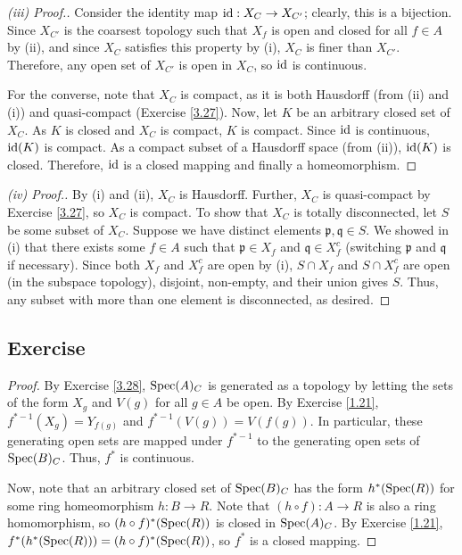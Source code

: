 \begin{proof}[(iii) Proof.]
Consider the identity map $\operatorname{id} : X_C \to X_{C'}$; clearly, this is a bijection. Since $X_{C'}$ is the coarsest topology such that $X_f$ is open and closed
for all $f \in A$ by (ii), and since $X_C$ satisfies this property by (i), $X_C$ is finer than $X_{C'}$. Therefore, any open set of $X_{C'}$ is open in $X_C$, 
so $\operatorname{id}$ is continuous.

For the converse, note that $X_C$ is compact, as it is both Hausdorff (from (ii) and (i)) and quasi-compact (Exercise \ref{3.27}). Now, 
let $K$ be an arbitrary closed set of $X_C$. As $K$ is closed and $X_C$ is compact, $K$ is compact. Since $\operatorname{id}$
is continuous, $\operatorname{id}(K)$ is compact. As a compact subset of a Hausdorff space (from (ii)), $\operatorname{id}(K)$ is closed. Therefore, $\operatorname{id}$ is a closed mapping and 
finally a homeomorphism.
\end{proof}

\begin{proof}[(iv) Proof.]
By (i) and (ii), $X_C$ is Hausdorff. Further, $X_C$ is quasi-compact by Exercise \ref{3.27}, so $X_C$ is compact. To show that $X_C$ is totally disconnected, let $S$ be some subset of $X_C$.
Suppose we have distinct elements $\mathfrak{p}, \mathfrak{q} \in S$. We showed in (i) that there exists some $f \in A$ such that $\mathfrak{p} \in X_f$ and $\mathfrak{q} \in X_f^c$ 
(switching $\mathfrak{p}$ and $\mathfrak{q}$ if necessary). Since both $X_f$ and $X_f^c$ are open by (i), $S\cap X_f$ and $S \cap X_f^c$ are open (in the subspace topology), disjoint, non-empty,
and their union gives $S$. Thus, any subset with more than one element is disconnected, as desired.
\end{proof}

\subsection{Exercise}\label{3.29}

\begin{proof}
By Exercise \ref{3.28}, $\operatorname{Spec}(A)_C$ is generated as a topology by letting the sets of the form $X_g$ and $V(g)$ for all $g \in A$ be open. By Exercise \ref{1.21}, $f^{*-1}(X_g) = Y_{f(g)}$ and $f^{*-1}(V(g)) = V(f(g))$. In particular,
these generating open sets are mapped under $f^{*-1}$ to the generating open sets of $\operatorname{Spec}(B)_C$. Thus, $f^*$ is continuous.

Now, note that an arbitrary closed set of $\operatorname{Spec}(B)_C$ has the form $h^*(\operatorname{Spec}(R))$ for some ring homeomorphism $h : B \to R$. Note that $(h \circ f) : A \to R$ is also a ring homomorphism, so $(h \circ f)^*(\operatorname{Spec}(R))$
is closed in $\operatorname{Spec}(A)_C$. By Exercise \ref{1.21}, $f^*(h^*(\operatorname{Spec}(R))) = (h \circ f)^*(\operatorname{Spec}(R))$, so $f^*$ is a closed mapping.
\end{proof}

